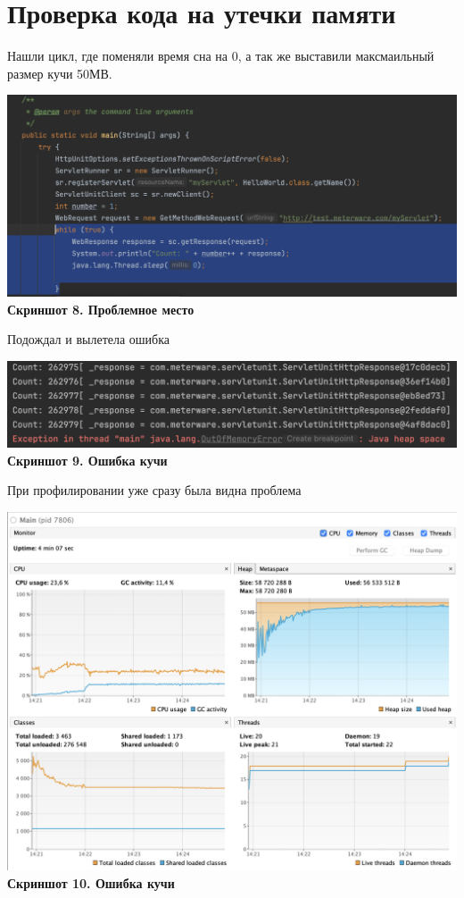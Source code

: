 \documentclass{article}
\begin{document}
\section{Проверка кода на утечки памяти}
Нашли цикл, где поменяли время сна на 0, а так же выставили максмаильный размер кучи 50МВ.
\begin{center}
    \includegraphics[width=.9\textwidth]{1.png}\\
    \textbf{Скриншот 8. Проблемное место}
\end{center}
Подождал и вылетела ошибка 
\begin{center}
    \includegraphics[width=.9\textwidth]{avoska.png}\\
    \textbf{Скриншот 9. Ошибка кучи}
\end{center}
При профилировании уже сразу была видна проблема
\begin{center}
    \includegraphics[width=.9\textwidth]{profil.png}\\
    \textbf{Скриншот 10. Ошибка кучи}
\end{center}
\end{document}
